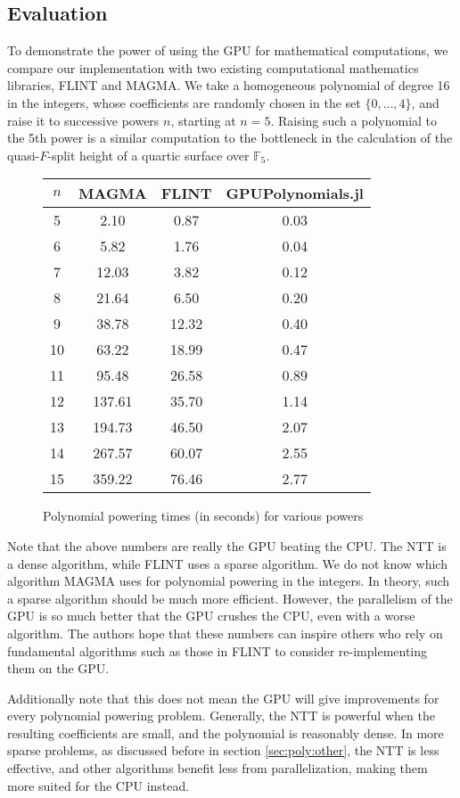 \subsection{Evaluation}

To demonstrate the power of using the GPU for mathematical computations, 
we compare our implementation
with two existing computational mathematics libraries, FLINT
and MAGMA.
We take a homogeneous polynomial of degree 16 in the integers,
whose coefficients are randomly chosen in the set 
\(\{0, \ldots, 4\}\), and raise it to successive powers \(n\),
starting at \(n=5\).
Raising such a polynomial to the 5th power is a similar 
computation to the bottleneck in the calculation of the
quasi-\(F\)-split height of a quartic surface over \(\mathbb{F}_{5}\).

\begin{figure}[h]
\begin{center}
\begin{tabular}{|c|c|c|c|}
    \hline
    \(n\) & MAGMA & FLINT & GPUPolynomials.jl \\
    \hline
    5 & 2.10 &    0.87 &  0.03 \\
    \hline
    6 & 5.82 &    1.76 &  0.04 \\
    \hline
    7 & 12.03 &   3.82 &  0.12 \\
    \hline
    8 & 21.64 &   6.50 &  0.20 \\
    \hline
    9 & 38.78 &   12.32 & 0.40 \\
    \hline
    10 & 63.22 &  18.99 & 0.47 \\
    \hline
    11 & 95.48 &  26.58 & 0.89 \\
    \hline
    12 & 137.61 & 35.70 & 1.14 \\
    \hline
    13 & 194.73 & 46.50 & 2.07 \\
    \hline
    14 & 267.57 & 60.07 & 2.55 \\
    \hline
    15 & 359.22 & 76.46 & 2.77 \\
    \hline
\end{tabular}
\caption{Polynomial powering times (in seconds) for various powers}
\end{center}
\end{figure}

Note that the above numbers are really the GPU beating the CPU.
The NTT is a dense algorithm, while FLINT uses a sparse algorithm.
We do not know which algorithm MAGMA uses for polynomial powering
in the integers.
In theory, such a sparse algorithm should
be much more efficient.
However, the parallelism of the GPU is so much better that the
GPU crushes the CPU, even with a worse algorithm.
The authors hope that these numbers can inspire others who
rely on fundamental algorithms such as those in FLINT to 
consider re-implementing them on the GPU.

Additionally note that this does not mean the GPU will give 
improvements for every polynomial powering 
problem. Generally, the NTT is powerful when the resulting 
coefficients are small, and the polynomial is reasonably dense. 
In more sparse problems, as discussed before in section \ref{sec:poly:other}, 
the NTT is less effective, and other algorithms benefit less 
from parallelization, making them more 
suited for the CPU instead.